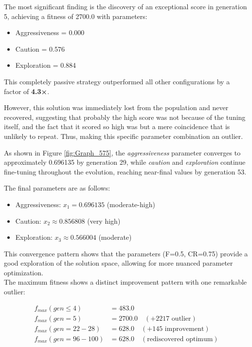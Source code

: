 \documentclass[sigconf]{acmart} %
\begin{document}
The most significant finding is the discovery of an exceptional score in generation 5, achieving a fitness of 2700.0 with parameters:
\begin{itemize}
    \item Aggressiveness = 0.000
    \item Caution = 0.576
    \item Exploration = 0.884
\end{itemize}
This completely passive strategy outperformed all other configurations by a factor of \textbf{4.3×}.

However, this solution was immediately lost from the population and never recovered, suggesting that probably the high score was not because of the tuning itself, and the fact that it scored so high was but a mere coincidence that is unlikely to repeat. Thus, making this specific parameter combination an outlier. 

As shown in Figure \ref{fig:Graph_575}, the \textit{aggressiveness} parameter converges to approximately 0.696135 by generation 29, while \textit{caution} and \textit{exploration} continue fine-tuning throughout the evolution, reaching near-final values by generation 53.

The final parameters are as follows:

\begin{itemize}
    \item Aggressiveness: $x_1 = 0.696135$ (moderate-high)
    \item Caution: $x_2 \approx 0.856808$ (very high)  
    \item Exploration: $x_3 \approx 0.566004$ (moderate)
\end{itemize}

This convergence pattern shows that the parameters (F=0.5, CR=0.75) provide a good exploration of the solution space, allowing for more nuanced parameter optimization. \\

The maximum fitness shows a distinct improvement pattern with one remarkable outlier:

\begin{align}
f_{max}(gen \leq 4) &= 483.0 \\
f_{max}(gen = 5) &= 2700.0 \quad (+2217 \text{ outlier}) \\
f_{max}(gen = 22-28) &= 628.0 \quad (+145 \text{ improvement}) \\
f_{max}(gen = 96-100) &= 628.0 \quad (\text{rediscovered optimum}) \\
\end{align}
\end{document}
